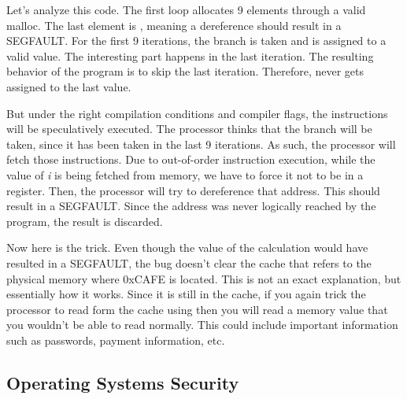 Let's analyze this code.
The first loop allocates 9 elements through a valid malloc.
The last element is , meaning a dereference should result in a SEGFAULT.
For the first 9 iterations, the branch is taken and  is assigned to a valid value.
The interesting part happens in the last iteration.
The resulting behavior of the program is to skip the last iteration.
Therefore,  never gets assigned to the last value.

But under the right compilation conditions and compiler flags, the instructions will be speculatively executed.
The processor thinks that the branch will be taken, since it has been taken in the last 9 iterations.
As such, the processor will fetch those instructions.
Due to out-of-order instruction execution, while the value of \emph{i} is being fetched from memory, we have to force it not to be in a register.
Then, the processor will try to dereference that address.
This should result in a SEGFAULT.
Since the address was never logically reached by the program, the result is discarded.

Now here is the trick.
Even though the value of the calculation would have resulted in a SEGFAULT, the bug doesn't clear the cache that refers to the physical memory where 0xCAFE is located. This is not an exact explanation, but essentially how it works.
Since it is still in the cache, if you again trick the processor to read form the cache using  then you will read a memory value that you wouldn't be able to read normally.
This could include important information such as passwords, payment information, etc.

\subsection{Operating Systems Security}

